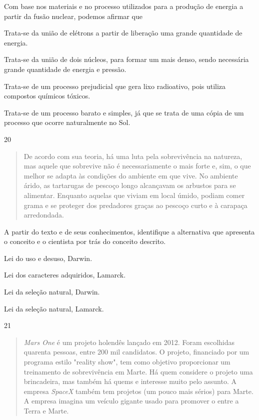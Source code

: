 \pagebreak
Com base nos materiais e no processo utilizados para a produção de
energia a partir da fusão nuclear, podemos afirmar que

\begin{escolha}
\item
  Trata-se da união de elétrons a partir de liberação uma grande quantidade de energia.
\item
  Trata-se da união de dois núcleos, para formar um mais denso, sendo
  necessária grande quantidade de energia e pressão.
\item
  Trata-se de um processo prejudicial que gera lixo radioativo, pois
  utiliza compostos químicos tóxicos.
\item
  Trata-se de um processo barato e simples, já que se trata de uma cópia
  de um processo que ocorre naturalmente no Sol.
\end{escolha}

\num{20}
\begin{quote}
  De acordo com sua teoria, há uma luta pela sobrevivência na
  natureza, mas aquele que sobrevive não é necessariamente o mais forte
  e, sim, o que melhor se adapta às condições do ambiente em que vive.
  No ambiente árido, as tartarugas de pescoço longo alcançavam os
  arbustos para se alimentar. Enquanto aquelas que viviam em local
  úmido, podiam comer grama e se proteger dos predadores graças ao
  pescoço curto e à carapaça arredondada.

\end{quote}

A partir do texto e de seus conhecimentos, identifique a alternativa que
apresenta o conceito e o cientista por trás do conceito descrito.

\begin{escolha}
\item
  Lei do uso e desuso, Darwin.
\item
  Lei dos caracteres adquiridos, Lamarck.
\item
  Lei da seleção natural, Darwin.
\item
  Lei da seleção natural, Lamarck.
\end{escolha}

\num{21}
  \begin{quote}
 \emph{Mars One} é um projeto holendês lançado em 2012. Foram
  escolhidas quarenta pessoas, entre 200 mil candidatos. O projeto, 
  financiado por um programa estilo "reality show", tem como objetivo proporcionar um treinamento de sobrevivência em Marte. Há quem considere o projeto uma brincadeira, mas também há quems e interesse muito pelo assunto. A empresa \emph{SpaceX} também tem projetos (um pouco mais sérios)
  para Marte. A empresa
  imagina um veículo gigante usado para promover o  entre a Terra e Marte.

\end{quote}

